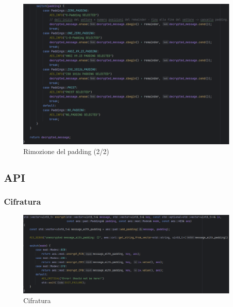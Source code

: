 \begin{figure}[H]
	\centering
	\includegraphics[width=1\textwidth, height=1\textheight, keepaspectratio]{./images/code/cpp/padding/remove_padding1.PNG}
	\caption{Rimozione del padding (2/2)}
	\label{fig:remove_padding1}
\end{figure}

\textsf{\small } %

\subsection{API}

\textsf{\small }


\subsubsection{Cifratura}

\textsf{\small }

\begin{figure}[H]
	\centering
	\includegraphics[width=1\textwidth, height=1\textheight, keepaspectratio]{./images/code/cpp/api/encrypt.PNG}
	\caption{Cifratura}
	\label{fig:encrypt}
\end{figure}

